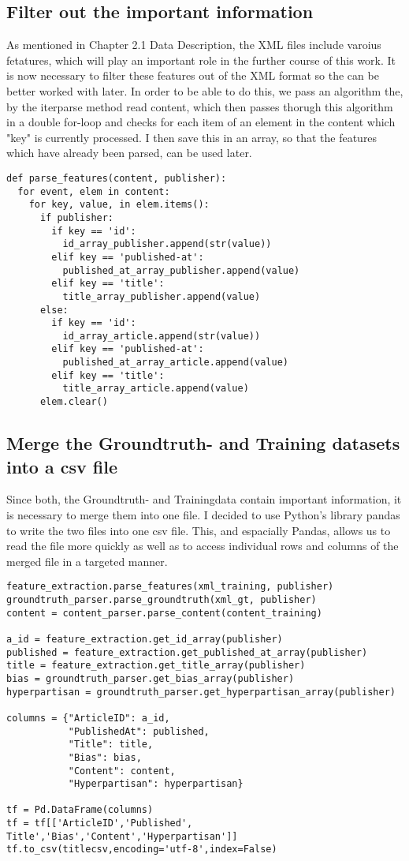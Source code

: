 \documentclass[11pt,titlepage,oneside,openany]{book}
\begin{document}
\subsection{Filter out the important information}
As mentioned in Chapter 2.1 Data Description, the XML files include varoius fetatures, which will play an important role in the further course of this work. It is now necessary to filter these features out of the XML format so the can be better worked with later. In order to be able to do this, we pass an algorithm the, by the iterparse method read content, which then passes thorugh this algorithm in a double for-loop and checks for each item of an element in the content which "key" is currently processed. I then save this in an array, so that the features which have already been parsed, can be used later. 
\begin{lstlisting}[frame=single]
def parse_features(content, publisher):
  for event, elem in content:
    for key, value, in elem.items():
      if publisher:
        if key == 'id':
          id_array_publisher.append(str(value))
        elif key == 'published-at':
          published_at_array_publisher.append(value)
        elif key == 'title':
          title_array_publisher.append(value)
      else:
        if key == 'id':
          id_array_article.append(str(value))
        elif key == 'published-at':
          published_at_array_article.append(value)
        elif key == 'title':
          title_array_article.append(value)
      elem.clear()
\end{lstlisting}


\subsection{Merge the Groundtruth- and Training datasets into a csv file}
Since both, the Groundtruth- and Trainingdata contain important information, it is necessary to merge them into one file. I decided to use Python's library pandas to write the two files into one csv file. This, and espacially Pandas, allows us to read the file more quickly as well as to access individual rows and columns of the merged file in a targeted manner.
\begin{lstlisting}[frame=single]
feature_extraction.parse_features(xml_training, publisher)
groundtruth_parser.parse_groundtruth(xml_gt, publisher)
content = content_parser.parse_content(content_training)

a_id = feature_extraction.get_id_array(publisher)
published = feature_extraction.get_published_at_array(publisher)
title = feature_extraction.get_title_array(publisher)
bias = groundtruth_parser.get_bias_array(publisher)
hyperpartisan = groundtruth_parser.get_hyperpartisan_array(publisher)

columns = {"ArticleID": a_id,
           "PublishedAt": published,
           "Title": title,
           "Bias": bias,
           "Content": content,
           "Hyperpartisan": hyperpartisan}

tf = Pd.DataFrame(columns)
tf = tf[['ArticleID','Published', Title','Bias','Content','Hyperpartisan']]
tf.to_csv(titlecsv,encoding='utf-8',index=False)
\end{lstlisting}
\end{document}
